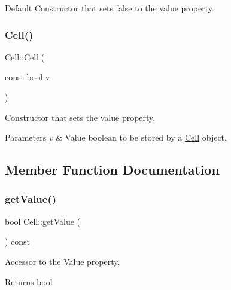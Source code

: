Default Constructor that sets false to the value property. \mbox{\label{class_cell_a2ab5845d5581d0f860e496da292993d6}} 
\subsubsection{\texorpdfstring{Cell()}{Cell()}\hspace{0.1cm}{\footnotesize\ttfamily [2/2]}}
{\footnotesize\ttfamily Cell\+::\+Cell (\begin{DoxyParamCaption}\item[{const bool}]{v }\end{DoxyParamCaption})\hspace{0.3cm}{\ttfamily [inline]}}

Constructor that sets the value property.


\begin{DoxyParams}{Parameters}
{\em v} & Value boolean to be stored by a \mbox{\hyperlink{class_cell}{Cell}} object. \\
\hline
\end{DoxyParams}


\subsection{Member Function Documentation}
\mbox{\label{class_cell_af0ff17e13f236d36b3623c16909d2eff}} 
\subsubsection{\texorpdfstring{get\+Value()}{getValue()}}
{\footnotesize\ttfamily bool Cell\+::get\+Value (\begin{DoxyParamCaption}{ }\end{DoxyParamCaption}) const\hspace{0.3cm}{\ttfamily [inline]}}

Accessor to the Value property.

\begin{DoxyReturn}{Returns}
bool 
\end{DoxyReturn}
\mbox{\label{class_cell_afc72dd1488c81e51aeb954ba7233e4aa}} 
